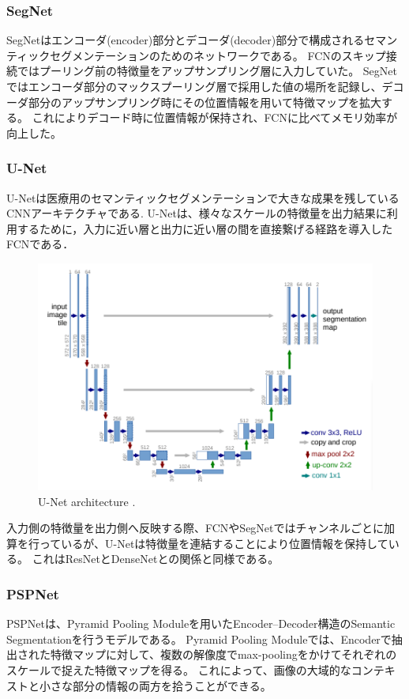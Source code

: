\subsubsection{SegNet}
    SegNet\cite{badrinarayanan2017segnet}はエンコーダ(encoder)部分とデコーダ(decoder)部分で構成されるセマンティックセグメンテーションのためのネットワークである。
    FCNのスキップ接続ではプーリング前の特徴量をアップサンプリング層に入力していた。
    SegNetではエンコーダ部分のマックスプーリング層で採用した値の場所を記録し、デコーダ部分のアップサンプリング時にその位置情報を用いて特徴マップを拡大する。
    これによりデコード時に位置情報が保持され、FCNに比べてメモリ効率が向上した。

\subsubsection{U-Net}
    U-Net\cite{ronneberger2015u}は医療用のセマンティックセグメンテーションで大きな成果を残しているCNNアーキテクチャである.
    U-Netは、様々なスケールの特徴量を出力結果に利用するために，入力に近い層と出力に近い層の間を直接繋げる経路を導入したFCNである．
    \begin{figure}[ht]
      \centering
      \includegraphics[width=12cm]{8_appendix/img/unet.png}
      \caption{U-Net architecture \cite{ronneberger2015u}.}
    \end{figure}

    入力側の特徴量を出力側へ反映する際、FCNやSegNetではチャンネルごとに加算を行っているが、U-Netは特徴量を連結することにより位置情報を保持している。
    これはResNetとDenseNetとの関係と同様である。

\subsubsection{PSPNet}
    PSPNet\cite{zhao2017pyramid}は、Pyramid Pooling Moduleを用いたEncoder–Decoder構造のSemantic Segmentationを行うモデルである。
    Pyramid Pooling Moduleでは、Encoderで抽出された特徴マップに対して、複数の解像度でmax-poolingをかけてそれぞれのスケールで捉えた特徴マップを得る。
    これによって、画像の大域的なコンテキストと小さな部分の情報の両方を拾うことができる。
    
